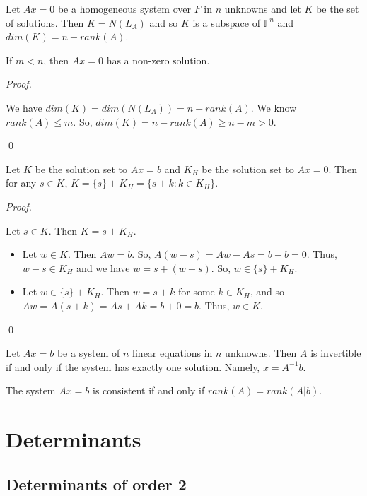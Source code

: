 \documentclass[12pt]{article}
\newenvironment{theorem}[2][Theorem]{\begin{trivlist}
\item[\hskip \labelsep {\bfseries #1}\hskip \labelsep {\bfseries #2.}]}{\end{trivlist}}
\newenvironment{corollary}[2][Corollary]{\begin{trivlist}
\item[\hskip \labelsep {\bfseries #1}\hskip \labelsep {\bfseries #2}]}{\end{trivlist}}
\newenvironment{sol}
    {\emph{Proof.}
    }
    {
    \qed
    }
\begin{document}
\begin{theorem}{3.8}
Let $Ax = 0$ be a homogeneous system over $F$ in $n$ unknowns and let $K$ be the set of solutions. Then $K = N(L_A)$ and so $K$ is a subspace of $\mathbb{F}^n$ and $dim(K) = n - rank(A)$.
\end{theorem}

\begin{corollary}{12}
If $m < n$, then $Ax = 0$ has a non-zero solution.
\end{corollary}

\begin{sol}
We have $dim(K) = dim(N(L_A)) = n - rank(A)$. We know $rank(A) \leq m$. So, $dim(K) = n - rank(A) \geq n - m > 0$.
\end{sol}

\begin{theorem}{3.9}
Let $K$ be the solution set to $Ax = b$ and $K_H$ be the solution set to $Ax = 0$. Then for any $s \in K$, $K = \{s\} + K_H = \{s + k : k \in K_H\}$.
\end{theorem}

\begin{sol}
Let $s \in K$. Then $K = s + K_H$. \begin{itemize}
    \item[(1)] Let $w \in K$. Then $Aw = b$. So, $A(w-s) = Aw - As = b - b = 0$. Thus, $w-s \in K_H$ and we have $w = s + (w - s)$. So, $w \in \{s\} + K_H$. 
    \item[(2)] Let $w \in \{s\} + K_H$. Then $w = s + k$ for some $k \in K_H$, and so $Aw = A(s+k) = As + Ak = b + 0 = b$. Thus, $w \in K$. 
\end{itemize}
\end{sol}

\begin{theorem}{3.10}
Let $Ax = b$ be a system of $n$ linear equations in $n$ unknowns. Then $A$ is invertible if and only if the system has exactly one solution. Namely, $x = A^{-1}b$.
\end{theorem}

\begin{theorem}{3.11}
The system $Ax = b$ is consistent if and only if $rank(A) = rank(A | b)$.
\end{theorem}

\section{Determinants}
\subsection{Determinants of order 2}
\end{document}
